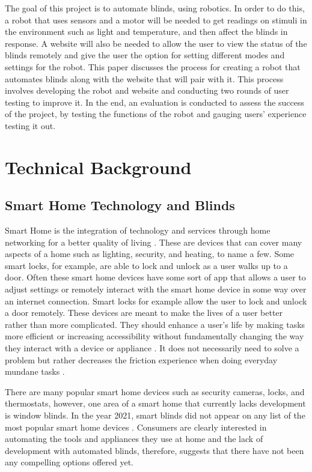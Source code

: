 \documentclass[10pt,twocolumn]{article}
\begin{document}
The goal of this project is to automate blinds, using robotics. In order to do this, a robot that uses sensors and a motor will be needed to get readings on stimuli in the environment such as light and temperature, and then affect the blinds in response. A website will also be needed to allow the user to view the status of the blinds remotely and give the user the option for setting different modes and settings for the robot. This paper discusses the process for creating a robot that automates blinds along with the website that will pair with it. This process involves developing the robot and website and conducting two rounds of user testing to improve it. In the end, an evaluation is conducted to assess the success of the project, by testing the functions of the robot and gauging users’ experience testing it out.


\section{Technical Background}
\subsection{Smart Home Technology and Blinds}
Smart Home is the integration of technology and services through home networking for a better quality of living \cite{Hayes2022SmartHome}. These are devices that can cover many aspects of a home such as lighting, security, and heating, to name a few. Some smart locks, for example, are able to lock and unlock as a user walks up to a door. Often these smart home devices have some sort of app that allows a user to adjust settings or remotely interact with the smart home device in some way over an internet connection. Smart locks for example allow the user to lock and unlock a door remotely. These devices are meant to make the lives of a user better rather than more complicated. They should enhance a user’s life by making tasks more efficient or increasing accessibility without fundamentally changing the way they interact with a device or appliance \cite{Tamayo2022SmartHome}. It does not necessarily need to solve a problem but rather decreases the friction experience when doing everyday mundane tasks \cite{Tamayo2022SmartHome}.

There are many popular smart home devices such as security cameras, locks, and thermostats, however, one area of a smart home that currently lacks development is window blinds. In the year 2021, smart blinds did not appear on any list of the most popular smart home devices \cite{Woodall2021Popular}. Consumers are clearly interested in automating the tools and appliances they use at home and the lack of development with automated blinds, therefore, suggests that there have not been any compelling options offered yet.
\end{document}
